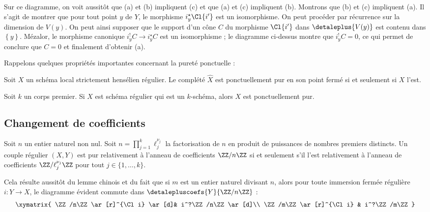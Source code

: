 \documentclass[10pt]{../fichiers-configuration-latex/smfart}
\begin{document}
Sur ce diagramme, on voit aussitôt que (a) et (b) impliquent (c) et que
(a) et (c) impliquent (b). Montrons que (b) et (c) impliquent (a). Il
s'agit de montrer que pour tout point $y$ de $Y$, le morphisme 
$i_y^\star \Cl {i'}$ est un isomorphisme.
On peut procéder par récurrence sur la
dimension de $V(y)$. On peut ainsi supposer que le support d'un
cône $C$ du morphisme
$\Cl {i'}$ dans $\detaleplus {V(y)}$ est contenu dans $\left\{y\right\}$.
Mézalor, le morphisme
canonique $i_y^!C\to i_y^\star C$ est un isomorphisme ; le diagramme
ci-dessus montre que $i_y^!C=0$, ce qui permet de conclure que $C=0$ et
finalement d'obtenir (a).

\bigskip

Rappelons quelques propriétés importantes concernant la pureté ponctuelle :

\begin{proposition2}%
\label{16-proposition-purete-ponctuelle-completion}
Soit $X$ un schéma local strictement hensélien régulier.
Le complété $\hat{X}$ est
ponctuellement pur en son point fermé si et seulement si $X$ l'est.
\end{proposition2}

\begin{proposition2}%
\label{16-proposition-purete-egale-caracteristique}
Soit $k$ un corps premier. Si $X$ est schéma régulier qui est
un $k$-schéma, alors $X$ est ponctuellement pur.
\end{proposition2}

\subsection{Changement de coefficients}%
\label{16-subsection-changement-de-coefficients}

\begin{proposition2}\label{16-proposition-lemme-chinois}
Soit $n$ un entier naturel non nul.
Soit $n=\prod_{j=1}^k \ell_j^{\nu_j}$ la factorisation de $n$ en produit de
puissances de nombres premiers distincts. Un couple régulier $(X,Y)$ est
pur relativement à l'anneau de coefficients $\ZZ/n\ZZ$ si et seulement
s'il l'est relativement à l'anneau de coefficients $\ZZ/\ell_j^{\nu_j}\ZZ$
pour tout $j\in\{1,\dots,k\}$.
\end{proposition2}

Cela résulte aussitôt du lemme chinois et du fait que si $m$ est un
entier naturel divisant $n$, alors pour toute immersion fermée régulière
$i\colon Y \to X$, le diagramme évident commute dans $\detalepluscoefs{Y}{\ZZ/n\ZZ}$ :
\[
\xymatrix{
\ZZ/n\ZZ\ar[r]^{\Cl i} \ar[d]& i^?\ZZ/n\ZZ\ar[d]\\
\ZZ/m\ZZ\ar[r]^{\Cl i}       & i^?\ZZ/m\ZZ}
\]
\end{document}

